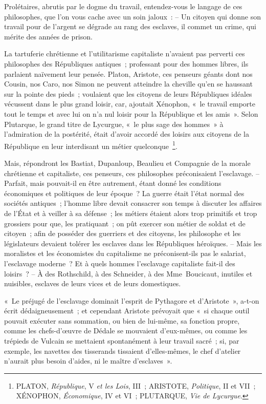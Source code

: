 \documentclass[french,twoside]{book} %
\newenvironment{quoteblock}%
  {\begin{quoting}}
  {\end{quoting}}
\newenvironment{quotebar}{%
    \def\FrameCommand{{\color{rubric!10!}\vrule width 0.5em} \hspace{0.9em}}%
    \def\OuterFrameSep{\itemsep} %
    \MakeFramed {\advance\hsize-\width \FrameRestore}
  }%
  {%
    \endMakeFramed
  }
\renewenvironment{quoteblock}%
  {%
    \savenotes
    \setstretch{0.9}
    \normalfont
    \begin{quotebar}
  }
  {%
    \end{quotebar}
    \spewnotes
  }
\begin{document}
\noindent Prolétaires, abrutis par le dogme du travail, entendez-vous le langage de ces philosophes, que l’on vous cache avec un soin jaloux : – Un citoyen qui donne son travail pour de l’argent se dégrade au rang des esclaves, il commet un crime, qui mérite des années de prison.\par
La tartuferie chrétienne et l’utilitarisme capitaliste n’avaient pas perverti ces philosophes des Républiques antiques ; professant pour des hommes libres, ils parlaient naïvement leur pensée. Platon, Aristote, ces penseurs géants dont nos Cousin, nos Caro, nos Simon ne peuvent atteindre la cheville qu’en se haussant sur la pointe des pieds ; voulaient que les citoyens de leurs Républiques idéales vécussent dans le plus grand loisir, car, ajoutait Xénophon, « le travail emporte tout le temps et avec lui on n’a nul loisir pour la République et les amis ». Selon Plutarque, le grand titre de Lycurgue, « le plus sage des hommes » à l’admiration de la postérité, était d’avoir accordé des loisirs aux citoyens de la République en leur interdisant un métier quelconque \footnote{PLATON, \emph{République}, V \emph{et les Lois}, III ; ARISTOTE, \emph{Politique}, II et VII ; XÉNOPHON, \emph{Économique}, IV et VI ; PLUTARQUE, \emph{Vie de Lycurgue}.}.\par
Mais, répondront les Bastiat, Dupanloup, Beaulieu et Compagnie de la morale chrétienne et capitaliste, ces penseurs, ces philosophes préconisaient l’esclavage. – Parfait, mais pouvait-il en être autrement, étant donné les conditions économiques et politiques de leur époque ? La guerre était l’état normal des sociétés antiques ; l’homme libre devait consacrer son temps à discuter les affaires de l’État et à veiller à sa défense ; les métiers étaient alors trop primitifs et trop grossiers pour que, les pratiquant ; on pût exercer son métier de soldat et de citoyen ; afin de posséder des guerriers et des citoyens, les philosophe et les législateurs devaient tolérer les esclaves dans les Républiques héroïques. – Mais les moralistes et les économistes du capitalisme ne préconisent-ils pas le salariat, l’esclavage moderne ? Et à quels hommes l’esclavage capitaliste fait-il des loisirs ? – À des Rothschild, à des Schneider, à des Mme Boucicaut, inutiles et nuisibles, esclaves de leurs vices et de leurs domestiques.\par

\begin{quoteblock}
 \noindent « Le préjugé de l’esclavage dominait l’esprit de Pythagore et d’Aristote », a-t-on écrit dédaigneusement ; et cependant Aristote prévoyait que « si chaque outil pouvait exécuter sans sommation, ou bien de lui-même, sa fonction propre, comme les chefs-d’œuvre de Dédale se mouvaient d’eux-mêmes, ou comme les trépieds de Vulcain se mettaient spontanément à leur travail sacré ; si, par exemple, les navettes des tisserands tissaient d’elles-mêmes, le chef d’atelier n’aurait plus besoin d’aides, ni le maître d’esclaves ».
\end{quoteblock}
\end{document}
